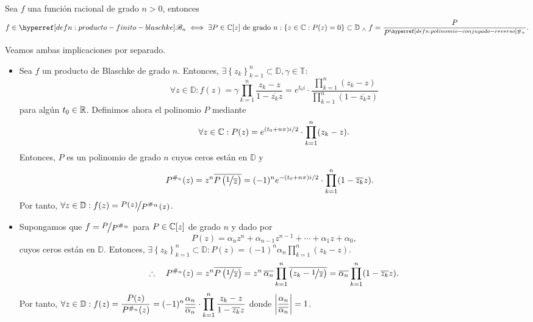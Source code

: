 \begin{teo}\label{teo:carac-prod-finito-blaschke-fn-racional}
    Sea $f$ una función racional de grado $n > 0$, entonces
    \[
    f \in \exhyperref[defn:producto-finito-blaschke]{producto-finito-blaschke}{\mathscr{B}_n} \iff \exists P \in \C[z] \text{ de grado } n : \left\{z \in \C : P(z) = 0\right\} \subset \mathbb{D} \we f = \frac{P}{P^{\exhyperref[defn:polinomio-conjugado-reverso]{polinomio-conjugado-reverso}{\#_n}}}.
    \]
\end{teo}
\begin{dem}
    Veamos ambas implicaciones por separado.
    \begin{itemize}[wide, labelindent=0pt]
        \item[$\boxed{\Rightarrow}$] Sea $f$ un producto de Blaschke de grado $n$. Entonces, $\exists \left\{z_k\right\}_{k=1}^n \subset \mathbb{D}, \gamma \in \mathbb{T} : $
        \[
        \forall z \in \mathbb{D} : f(z) = \gamma \prod_{k=1}^n \frac{z_k - z}{1 - \overline{z_k} z} = e^{t_0i} \cdot \frac{\prod_{k=1}^n (z_k - z)}{\prod_{k=1}^n (1 - \overline{z_k} z)}
        \]
        para algún $t_0 \in \mathbb{R}$. Definimos ahora el polinomio $P$ mediante
        \[
        \forall z \in \mathbb{C} : P(z) = e^{(t_0 + n\pi)i/2} \cdot \prod_{k=1}^n (z_k - z).
        \]
        Entonces, $P$ es un polinomio de grado $n$ cuyos ceros están en $\mathbb{D}$ y
        \[
        \begin{aligned}
            P^{\#_n}(z) = z^n \bar{P \left(\sfrac{1}{\bar{z}}\right)} &= (-1)^n e^{-(t_0 + n\pi)i/2} \cdot \prod_{k=1}^n (1 - \overline{z_k} z).
        \end{aligned}
        \]
        Por tanto, $\forall z \in \mathbb{D} : f(z) = \sfrac{P(z)}{P^{\#_n}(z)}$.

        \item[$\boxed{\Leftarrow}$] Supongamos que $f = \sfrac{P}{P^{\#_n}}$ para $P \in \mathbb{C}[z]$ de grado $n$ y dado por
        \[
        P(z) = \alpha_n z^n + \alpha_{n-1} z^{n-1} + \cdots + \alpha_1 z + \alpha_0,
        \]
        cuyos ceros están en $\mathbb{D}$. Entonces, $\exists \left\{z_k\right\}_{k=1}^n \subset \mathbb{D}: P(z) = (-1)^n \alpha_n \prod_{k=1}^n (z_k - z)$.
        \[
        \begin{aligned}
            \therefore \quad P^{\#_n}(z) = z^n \bar{P \left(\sfrac{1}{\bar{z}}\right)} = z^n\, \bar{\alpha_n} \prod_{k=1}^n \bar{\left(z_k - \sfrac{1}{\bar{z}}\right)} = \bar{\alpha_n} \prod_{k=1}^n (1 - \overline{z_k} z).
        \end{aligned}
        \]
        Por tanto, $\forall z \in \mathbb{D} : \displaystyle f(z) = \frac{P(z)}{P^{\#_n}(z)} = (-1)^n \frac{\alpha_n}{\overline{\alpha_n}} \cdot \prod_{k=1}^n \frac{z_k - z}{1 - \overline{z_k} z}$ donde $\displaystyle \left|\frac{\alpha_n}{\overline{\alpha_n}}\right| = 1$.\hfill\qedsymbol
    \end{itemize}
\end{dem}

